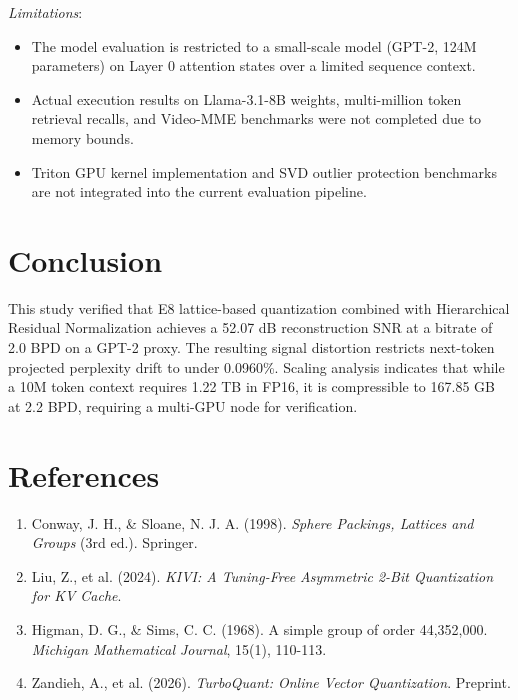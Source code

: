 \documentclass[journal,onecolumn,12pt]{IEEEtran}
\begin{document}
\textit{Limitations}:
\begin{itemize}
    \item The model evaluation is restricted to a small-scale model (GPT-2, 124M parameters) on Layer 0 attention states over a limited sequence context.
    \item Actual execution results on Llama-3.1-8B weights, multi-million token retrieval recalls, and Video-MME benchmarks were not completed due to memory bounds.
    \item Triton GPU kernel implementation and SVD outlier protection benchmarks are not integrated into the current evaluation pipeline.
\end{itemize}

\section{Conclusion}
This study verified that E8 lattice-based quantization combined with Hierarchical Residual Normalization achieves a 52.07 dB reconstruction SNR at a bitrate of 2.0 BPD on a GPT-2 proxy. The resulting signal distortion restricts next-token projected perplexity drift to under 0.0960\%. Scaling analysis indicates that while a 10M token context requires 1.22 TB in FP16, it is compressible to 167.85 GB at 2.2 BPD, requiring a multi-GPU node for verification.

\section*{References}
\begin{enumerate}
    \item Conway, J. H., & Sloane, N. J. A. (1998). \textit{Sphere Packings, Lattices and Groups} (3rd ed.). Springer.
    \item Liu, Z., et al. (2024). \textit{KIVI: A Tuning-Free Asymmetric 2-Bit Quantization for KV Cache}.
    \item Higman, D. G., & Sims, C. C. (1968). A simple group of order 44,352,000. \textit{Michigan Mathematical Journal}, 15(1), 110-113.
    \item Zandieh, A., et al. (2026). \textit{TurboQuant: Online Vector Quantization}. Preprint.
\end{enumerate}
\end{document}
